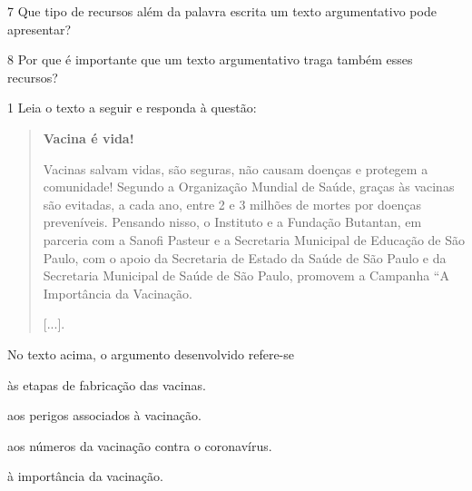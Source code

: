 \num{7} Que tipo de recursos além da palavra escrita um texto argumentativo
pode apresentar?



\num{8} Por que é importante que um texto argumentativo traga também esses recursos?




\num{1} Leia o texto a seguir e responda à questão:

\begin{quote}
\textbf{Vacina é vida!}

Vacinas salvam vidas, são seguras, não causam doenças e protegem a
comunidade! Segundo a Organização Mundial de Saúde, graças às vacinas
são evitadas, a cada ano, entre 2 e 3 milhões de mortes por doenças
preveníveis. Pensando nisso, o Instituto e a Fundação Butantan, em
parceria com a Sanofi Pasteur e a Secretaria Municipal de Educação de
São Paulo, com o apoio da Secretaria de Estado da Saúde de São Paulo e
da Secretaria Municipal de Saúde de São Paulo, promovem a Campanha ``A
Importância da Vacinação.

{[}...{]}.

\end{quote}

No texto acima, o argumento desenvolvido refere-se

\begin{escolha}
\item às etapas de fabricação das vacinas.

\item aos perigos associados à vacinação.

\item aos números da vacinação contra o coronavírus.

\item à importância da vacinação.
\end{escolha}


